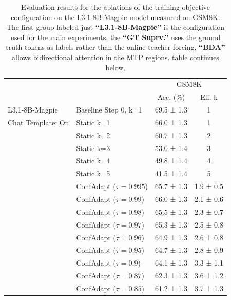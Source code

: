 \documentclass{article}
\theoremstyle{plain}
\theoremstyle{definition}
\theoremstyle{remark}
\begin{document}
\clearpage

\begin{table}[h!]
\small
\caption{Evaluation results for the ablations of the training objective configuration on the L3.1-8B-Magpie model measured on GSM8K. The first group labeled just \textbf{``L3.1-8B-Magpie''} is the configuration used for the main experiments, the \textbf{``GT Suprv.''} uses the ground truth tokens as labels rather than the online teacher forcing, \textbf{``BDA''} allows bidirectional attention in the MTP regions. table continues below.}
\label{tab:abl-l3-suprv-evals-pt1}
\centering
\begin{tabular}{llcc}
\toprule
 &  & \multicolumn{2}{c}{GSM8K} \\
 &  & Acc. (\%) & Eff. k \\
\midrule
L3.1-8B-Magpie & Baseline Step 0, k=1 & 69.5 ± 1.3 & 1 \\
 Chat Template: On & Static k=1 & 66.0 ± 1.3 & 1 \\
 & Static k=2 & 60.7 ± 1.3 & 2 \\
 & Static k=3 & 53.0 ± 1.4 & 3 \\
 & Static k=4 & 49.8 ± 1.4 & 4 \\
 & Static k=5 & 41.5 ± 1.4 & 5 \\
 & ConfAdapt ($\tau=0.995$) & 65.7 ± 1.3 & 1.9 ± 0.5 \\
 & ConfAdapt ($\tau=0.99$) & 66.0 ± 1.3 & 2.1 ± 0.6 \\
 & ConfAdapt ($\tau=0.98$) & 65.5 ± 1.3 & 2.3 ± 0.7 \\
 & ConfAdapt ($\tau=0.97$) & 65.3 ± 1.3 & 2.5 ± 0.8 \\
 & ConfAdapt ($\tau=0.96$) & 64.9 ± 1.3 & 2.6 ± 0.8 \\
 & ConfAdapt ($\tau=0.95$) & 64.7 ± 1.3 & 2.8 ± 0.9 \\
 & ConfAdapt ($\tau=0.9$) & 64.1 ± 1.3 & 3.3 ± 1.1 \\
 & ConfAdapt ($\tau=0.87$) & 62.3 ± 1.3 & 3.6 ± 1.2 \\
 & ConfAdapt ($\tau=0.85$) & 61.2 ± 1.3 & 3.7 ± 1.3 \\

\end{tabular}
\end{table}
\end{document}
